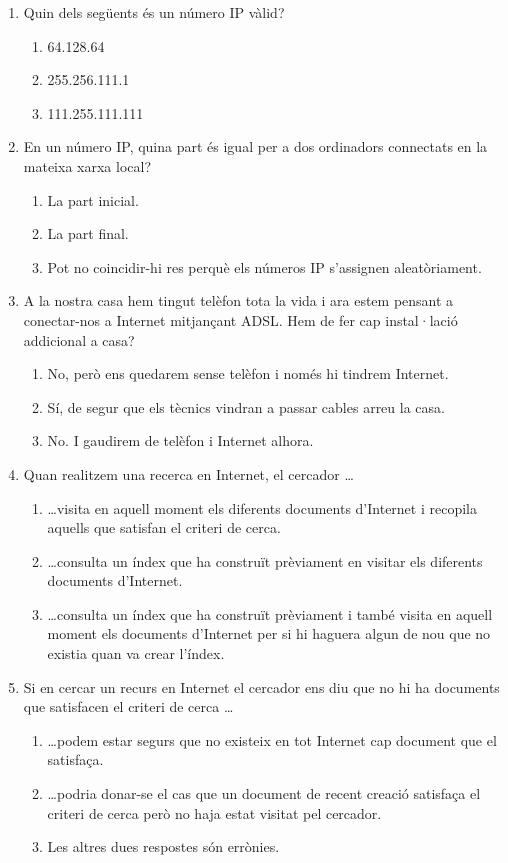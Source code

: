 \begin{enumerate}
\item Quin dels següents és un número IP vàlid?
  \begin{enumerate}
  \item 64.128.64
  \item 255.256.111.1
  \item 111.255.111.111
  \end{enumerate}

\item En un número IP, quina part és igual per a dos ordinadors
  connectats en la mateixa xarxa local?
  \begin{enumerate}
  \item La part inicial.
  \item La part final.
  \item Pot no coincidir-hi res perquè els números IP s'assignen
    aleatòriament.
  \end{enumerate}

\item A la nostra casa hem tingut telèfon tota la vida i ara estem
  pensant a conectar-nos a Internet mitjançant ADSL. Hem de fer cap
  instal·lació addicional a casa?
  \begin{enumerate}
  \item No, però ens quedarem sense telèfon i només hi tindrem
    Internet.
  \item Sí, de segur que els tècnics vindran a passar cables arreu la
    casa.
  \item No. I gaudirem de telèfon i Internet alhora.
  \end{enumerate}

\item Quan realitzem una recerca en Internet, el cercador \ldots
  \begin{enumerate}
  \item \ldots visita en aquell moment els diferents documents
    d'Internet i recopila aquells que satisfan el criteri de cerca.
  \item \ldots consulta un índex que ha construït prèviament en
    visitar els diferents documents d'Internet.
  \item \ldots consulta un índex que ha construït prèviament i també
    visita en aquell moment els documents d'Internet per si hi haguera
    algun de nou que no existia quan va crear l'índex.
  \end{enumerate}

\item Si en cercar un recurs en Internet el cercador ens diu que no hi
  ha documents que satisfacen el criteri de cerca \ldots
  \begin{enumerate}
  \item \ldots podem estar segurs que no existeix en tot Internet cap
    document que el satisfaça.
  \item \ldots podria donar-se el cas que un document de recent
    creació satisfaça el criteri de cerca però no haja estat visitat
    pel cercador.
  \item Les altres dues respostes són errònies.
  \end{enumerate}


\end{enumerate}
